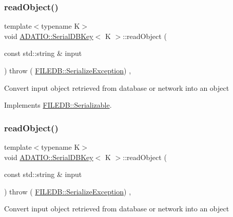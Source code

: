 \subsubsection{\texorpdfstring{readObject()}{readObject()}\hspace{0.1cm}{\footnotesize\ttfamily [1/3]}}
{\footnotesize\ttfamily template$<$typename K$>$ \\
void \mbox{\hyperlink{classADATIO_1_1SerialDBKey}{A\+D\+A\+T\+I\+O\+::\+Serial\+D\+B\+Key}}$<$ K $>$\+::read\+Object (\begin{DoxyParamCaption}\item[{const std\+::string \&}]{input }\end{DoxyParamCaption}) throw ( \mbox{\hyperlink{classFILEDB_1_1SerializeException}{F\+I\+L\+E\+D\+B\+::\+Serialize\+Exception}}) \hspace{0.3cm}{\ttfamily [inline]}, {\ttfamily [virtual]}}

Convert input object retrieved from database or network into an object 

Implements \mbox{\hyperlink{classFILEDB_1_1Serializable_a21a5831fa4f65790490a8a5eba9fcab2}{F\+I\+L\+E\+D\+B\+::\+Serializable}}.

\mbox{\label{classADATIO_1_1SerialDBKey_a10b5c24f2529bac1df4c4603c2caf551}} 
\subsubsection{\texorpdfstring{readObject()}{readObject()}\hspace{0.1cm}{\footnotesize\ttfamily [2/3]}}
{\footnotesize\ttfamily template$<$typename K$>$ \\
void \mbox{\hyperlink{classADATIO_1_1SerialDBKey}{A\+D\+A\+T\+I\+O\+::\+Serial\+D\+B\+Key}}$<$ K $>$\+::read\+Object (\begin{DoxyParamCaption}\item[{const std\+::string \&}]{input }\end{DoxyParamCaption}) throw ( \mbox{\hyperlink{classFILEDB_1_1SerializeException}{F\+I\+L\+E\+D\+B\+::\+Serialize\+Exception}}) \hspace{0.3cm}{\ttfamily [inline]}, {\ttfamily [virtual]}}

Convert input object retrieved from database or network into an object 

